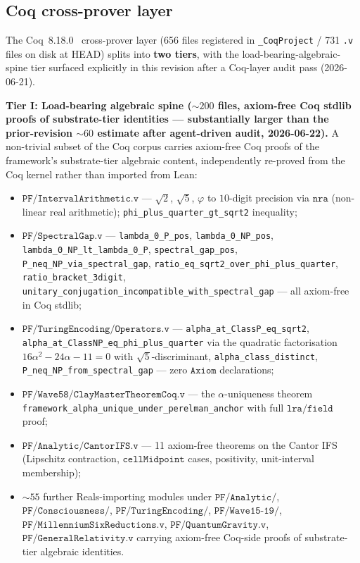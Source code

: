 \documentclass[11pt,a4paper]{amsart}
\theoremstyle{plain}
\theoremstyle{definition}
\begin{document}
\subsection{Coq cross-prover layer}

The Coq~8.18.0~\cite{barras-bertot2009} cross-prover layer (656 files registered in \texttt{\_CoqProject} / 731 \texttt{.v} files on disk at HEAD) splits into \textbf{two tiers}, with the load-bearing-algebraic-spine tier surfaced explicitly in this revision after a Coq-layer audit pass (2026-06-21).

\textbf{Tier I: Load-bearing algebraic spine ($\sim 200$ files, axiom-free Coq stdlib proofs of substrate-tier identities --- substantially larger than the prior-revision $\sim 60$ estimate after agent-driven audit, 2026-06-22).} A non-trivial subset of the Coq corpus carries axiom-free Coq proofs of the framework's substrate-tier algebraic content, independently re-proved from the Coq kernel rather than imported from Lean:
\begin{itemize}[leftmargin=2em,itemsep=2pt]
\item $\texttt{PF/IntervalArithmetic.v}$ --- $\sqrt{2}$, $\sqrt{5}$, $\varphi$ to $10$-digit precision via $\texttt{nra}$ (non-linear real arithmetic); \texttt{phi\_plus\_quarter\_gt\_sqrt2} inequality;
\item $\texttt{PF/SpectralGap.v}$ --- \texttt{lambda\_0\_P\_pos}, \texttt{lambda\_0\_NP\_pos}, \texttt{lambda\_0\_NP\_lt\_lambda\_0\_P}, \texttt{spectral\_gap\_pos}, \texttt{P\_neq\_NP\_via\_spectral\_gap}, \texttt{ratio\_eq\_sqrt2\_over\_phi\_plus\_quarter}, \texttt{ratio\_bracket\_3digit}, \texttt{unitary\_conjugation\_incompatible\_with\_spectral\_gap} --- all axiom-free in Coq stdlib;
\item $\texttt{PF/TuringEncoding/Operators.v}$ --- \texttt{alpha\_at\_ClassP\_eq\_sqrt2}, \texttt{alpha\_at\_ClassNP\_eq\_phi\_plus\_quarter} via the quadratic factorisation $16\alpha^2 - 24\alpha - 11 = 0$ with $\sqrt{5}$-discriminant, \texttt{alpha\_class\_distinct}, \texttt{P\_neq\_NP\_from\_spectral\_gap} --- zero $\texttt{Axiom}$ declarations;
\item $\texttt{PF/Wave58/ClayMasterTheoremCoq.v}$ --- the $\alpha$-uniqueness theorem \texttt{framework\_alpha\_unique\_under\_perelman\_anchor} with full $\texttt{lra}/\texttt{field}$ proof;
\item $\texttt{PF/Analytic/CantorIFS.v}$ --- 11 axiom-free theorems on the Cantor IFS (Lipschitz contraction, $\texttt{cellMidpoint}$ cases, positivity, unit-interval membership);
\item $\sim 55$ further Reals-importing modules under $\texttt{PF/Analytic/}$, $\texttt{PF/Consciousness/}$, $\texttt{PF/TuringEncoding/}$, $\texttt{PF/Wave15-19/}$, $\texttt{PF/MillenniumSixReductions.v}$, $\texttt{PF/QuantumGravity.v}$, $\texttt{PF/GeneralRelativity.v}$ carrying axiom-free Coq-side proofs of substrate-tier algebraic identities.
\end{itemize}
\end{document}
